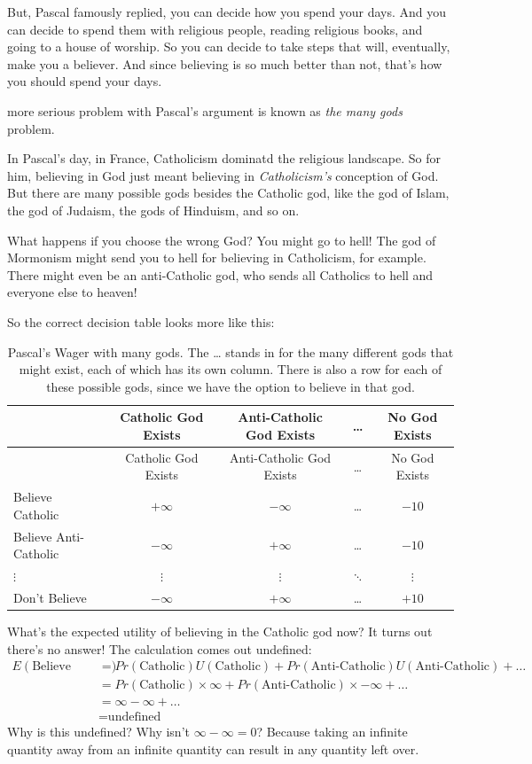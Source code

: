 \documentclass[justified]{tufte-book}
\renewcommand{\u}{U}
\newcommand{\p}{Pr}
\newcommand{\E}{E}
\theoremstyle{definition}
\theoremstyle{definition}
\theoremstyle{definition}
\theoremstyle{remark}
\begin{document}
But, Pascal famously replied, you can decide how you spend your days. And you can decide to spend them with religious people, reading religious books, and going to a house of worship. So you can decide to take steps that will, eventually, make you a believer. And since believing is so much better than not, that's how you should spend your days.

 more serious problem with Pascal's argument is known as \emph{the many gods} problem.

In Pascal's day, in France, Catholicism dominatd the religious landscape. So for him, believing in God just meant believing in \emph{Catholicism's} conception of God. But there are many possible gods besides the Catholic god, like the god of Islam, the god of Judaism, the gods of Hinduism, and so on.

What happens if you choose the wrong God? You might go to hell! The god of Mormonism might send you to hell for believing in Catholicism, for example. There might even be an anti-Catholic god, who sends all Catholics to hell and everyone else to heaven!

So the correct decision table looks more like this:

\begin{longtable}[]{@{}lcccc@{}}
\caption{\label{tab:manygods}Pascal's Wager with many gods. The \ldots{} stands in for the many different gods that might exist, each of which has its own column. There is also a row for each of these possible gods, since we have the option to believe in that god.}\tabularnewline
\toprule
& Catholic God Exists & Anti-Catholic God Exists & \ldots{} & No God Exists\tabularnewline
\midrule
\endfirsthead
\toprule
& Catholic God Exists & Anti-Catholic God Exists & \ldots{} & No God Exists\tabularnewline
\midrule
\endhead
Believe Catholic & \(+\infty\) & \(-\infty\) & \ldots{} & \(-10\)\tabularnewline
Believe Anti-Catholic & \(-\infty\) & \(+\infty\) & \ldots{} & \(-10\)\tabularnewline
\(\vdots\) & \(\vdots\) & \(\vdots\) & \(\ddots\) & \(\vdots\)\tabularnewline
Don't Believe & \(-\infty\) & \(+\infty\) & \ldots{} & \(+10\)\tabularnewline
\bottomrule
\end{longtable}

What's the expected utility of believing in the Catholic god now? It turns out there's no answer! The calculation comes out undefined:
\[
  \begin{aligned}
  \E(\mbox{Believe Catholic}) %
    &= \p(\mbox{Catholic})\u(\mbox{Catholic}) +%
       \p(\mbox{Anti-Catholic})\u(\mbox{Anti-Catholic}) + \ldots\\
    &= \p(\mbox{Catholic}) \times \infty + \p(\mbox{Anti-Catholic}) \times%
        -\infty + \ldots\\
    &= \infty - \infty + \ldots\\
    &= \mbox{undefined}
  \end{aligned}
\]
Why is this undefined? Why isn't \(\infty - \infty = 0\)? Because taking an infinite quantity away from an infinite quantity can result in any quantity left over.
\end{document}
